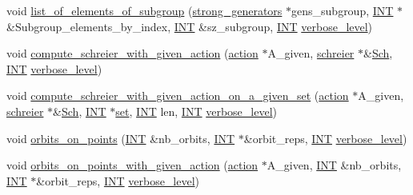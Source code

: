 \begin{DoxyCompactItemize}
\item 
void \mbox{\hyperlink{classstrong__generators_a9b584457f4dcbd964a4603ee219cc771}{list\+\_\+of\+\_\+elements\+\_\+of\+\_\+subgroup}} (\mbox{\hyperlink{classstrong__generators}{strong\+\_\+generators}} $\ast$gens\+\_\+subgroup, \mbox{\hyperlink{galois_8h_a09fddde158a3a20bd2dcadb609de11dc}{I\+NT}} $\ast$\&Subgroup\+\_\+elements\+\_\+by\+\_\+index, \mbox{\hyperlink{galois_8h_a09fddde158a3a20bd2dcadb609de11dc}{I\+NT}} \&sz\+\_\+subgroup, \mbox{\hyperlink{galois_8h_a09fddde158a3a20bd2dcadb609de11dc}{I\+NT}} \mbox{\hyperlink{simeon_8_c_a818073fbcc2f439e7c56952f67386122}{verbose\+\_\+level}})
\item 
void \mbox{\hyperlink{classstrong__generators_a4124e0060db9e45c8f698c9fab00d946}{compute\+\_\+schreier\+\_\+with\+\_\+given\+\_\+action}} (\mbox{\hyperlink{classaction}{action}} $\ast$A\+\_\+given, \mbox{\hyperlink{classschreier}{schreier}} $\ast$\&\mbox{\hyperlink{simeon_8_c_acbdfb9c3c18b898a9750f161e7255a6c}{Sch}}, \mbox{\hyperlink{galois_8h_a09fddde158a3a20bd2dcadb609de11dc}{I\+NT}} \mbox{\hyperlink{simeon_8_c_a818073fbcc2f439e7c56952f67386122}{verbose\+\_\+level}})
\item 
void \mbox{\hyperlink{classstrong__generators_aa051afe7d56819e4ebfb45c3f8506a72}{compute\+\_\+schreier\+\_\+with\+\_\+given\+\_\+action\+\_\+on\+\_\+a\+\_\+given\+\_\+set}} (\mbox{\hyperlink{classaction}{action}} $\ast$A\+\_\+given, \mbox{\hyperlink{classschreier}{schreier}} $\ast$\&\mbox{\hyperlink{simeon_8_c_acbdfb9c3c18b898a9750f161e7255a6c}{Sch}}, \mbox{\hyperlink{galois_8h_a09fddde158a3a20bd2dcadb609de11dc}{I\+NT}} $\ast$\mbox{\hyperlink{nauty_8h_a9690bea211101f22a5e154087590c3da}{set}}, \mbox{\hyperlink{galois_8h_a09fddde158a3a20bd2dcadb609de11dc}{I\+NT}} len, \mbox{\hyperlink{galois_8h_a09fddde158a3a20bd2dcadb609de11dc}{I\+NT}} \mbox{\hyperlink{simeon_8_c_a818073fbcc2f439e7c56952f67386122}{verbose\+\_\+level}})
\item 
void \mbox{\hyperlink{classstrong__generators_a0db41e5d931067f14ae1066e89988fba}{orbits\+\_\+on\+\_\+points}} (\mbox{\hyperlink{galois_8h_a09fddde158a3a20bd2dcadb609de11dc}{I\+NT}} \&nb\+\_\+orbits, \mbox{\hyperlink{galois_8h_a09fddde158a3a20bd2dcadb609de11dc}{I\+NT}} $\ast$\&orbit\+\_\+reps, \mbox{\hyperlink{galois_8h_a09fddde158a3a20bd2dcadb609de11dc}{I\+NT}} \mbox{\hyperlink{simeon_8_c_a818073fbcc2f439e7c56952f67386122}{verbose\+\_\+level}})
\item 
void \mbox{\hyperlink{classstrong__generators_ab903661b1847f798b7833035f2d2950c}{orbits\+\_\+on\+\_\+points\+\_\+with\+\_\+given\+\_\+action}} (\mbox{\hyperlink{classaction}{action}} $\ast$A\+\_\+given, \mbox{\hyperlink{galois_8h_a09fddde158a3a20bd2dcadb609de11dc}{I\+NT}} \&nb\+\_\+orbits, \mbox{\hyperlink{galois_8h_a09fddde158a3a20bd2dcadb609de11dc}{I\+NT}} $\ast$\&orbit\+\_\+reps, \mbox{\hyperlink{galois_8h_a09fddde158a3a20bd2dcadb609de11dc}{I\+NT}} \mbox{\hyperlink{simeon_8_c_a818073fbcc2f439e7c56952f67386122}{verbose\+\_\+level}})

\end{DoxyCompactItemize}
